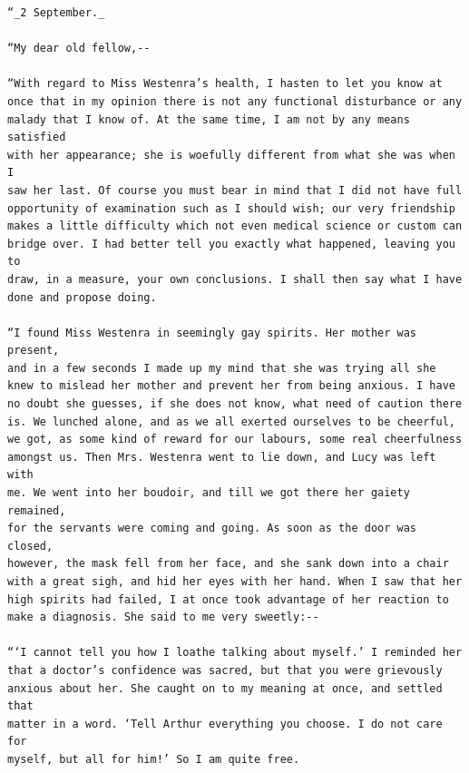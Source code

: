 \documentclass{article}
\begin{document}
\begin{verbatim}
“_2 September._

“My dear old fellow,--

“With regard to Miss Westenra’s health, I hasten to let you know at
once that in my opinion there is not any functional disturbance or any
malady that I know of. At the same time, I am not by any means satisfied
with her appearance; she is woefully different from what she was when I
saw her last. Of course you must bear in mind that I did not have full
opportunity of examination such as I should wish; our very friendship
makes a little difficulty which not even medical science or custom can
bridge over. I had better tell you exactly what happened, leaving you to
draw, in a measure, your own conclusions. I shall then say what I have
done and propose doing.

“I found Miss Westenra in seemingly gay spirits. Her mother was present,
and in a few seconds I made up my mind that she was trying all she
knew to mislead her mother and prevent her from being anxious. I have
no doubt she guesses, if she does not know, what need of caution there
is. We lunched alone, and as we all exerted ourselves to be cheerful,
we got, as some kind of reward for our labours, some real cheerfulness
amongst us. Then Mrs. Westenra went to lie down, and Lucy was left with
me. We went into her boudoir, and till we got there her gaiety remained,
for the servants were coming and going. As soon as the door was closed,
however, the mask fell from her face, and she sank down into a chair
with a great sigh, and hid her eyes with her hand. When I saw that her
high spirits had failed, I at once took advantage of her reaction to
make a diagnosis. She said to me very sweetly:--

“‘I cannot tell you how I loathe talking about myself.’ I reminded her
that a doctor’s confidence was sacred, but that you were grievously
anxious about her. She caught on to my meaning at once, and settled that
matter in a word. ‘Tell Arthur everything you choose. I do not care for
myself, but all for him!’ So I am quite free.


\end{verbatim}
\end{document}
